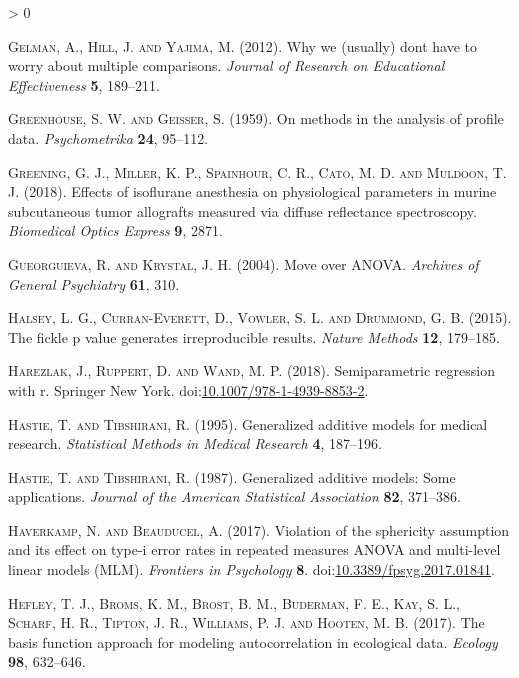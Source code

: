 \documentclass[
]{article}
\newlength{\cslhangindent}
\newenvironment{CSLReferences}[2] %
 {%
  \setlength{\parindent}{0pt}
  \ifodd #1 \everypar{\setlength{\hangindent}{\cslhangindent}}\ignorespaces\fi
  \ifnum #2 > 0
  \setlength{\parskip}{#2\baselineskip}
  \fi
 }%
 {}
\begin{document}
\begin{CSLReferences}{1}{0}
\leavevmode\hypertarget{ref-gelman2012}{}%
\textsc{Gelman, A., Hill, J. and Yajima, M.} (2012). Why we (usually) don{{}}t have to worry about multiple comparisons. \emph{Journal of Research on Educational Effectiveness} \textbf{5}, 189--211.

\leavevmode\hypertarget{ref-greenhouse1959}{}%
\textsc{Greenhouse, S. W. and Geisser, S.} (1959). On methods in the analysis of profile data. \emph{Psychometrika} \textbf{24}, 95--112.

\leavevmode\hypertarget{ref-greening2018}{}%
\textsc{Greening, G. J., Miller, K. P., Spainhour, C. R., Cato, M. D. and Muldoon, T. J.} (2018). Effects of isoflurane anesthesia on physiological parameters in murine subcutaneous tumor allografts measured via diffuse reflectance spectroscopy. \emph{Biomedical Optics Express} \textbf{9}, 2871.

\leavevmode\hypertarget{ref-gueorguieva2004}{}%
\textsc{Gueorguieva, R. and Krystal, J. H.} (2004). Move over {ANOVA}. \emph{Archives of General Psychiatry} \textbf{61}, 310.

\leavevmode\hypertarget{ref-halsey2015}{}%
\textsc{Halsey, L. G., Curran-Everett, D., Vowler, S. L. and Drummond, G. B.} (2015). The fickle p value generates irreproducible results. \emph{Nature Methods} \textbf{12}, 179--185.

\leavevmode\hypertarget{ref-harezlak2018}{}%
\textsc{Harezlak, J., Ruppert, D. and Wand, M. P.} (2018). Semiparametric regression with r. Springer New York. doi:\href{https://doi.org/10.1007/978-1-4939-8853-2}{10.1007/978-1-4939-8853-2}.

\leavevmode\hypertarget{ref-hastie1995}{}%
\textsc{Hastie, T. and Tibshirani, R.} (1995). Generalized additive models for medical research. \emph{Statistical Methods in Medical Research} \textbf{4}, 187--196.

\leavevmode\hypertarget{ref-hastie1987}{}%
\textsc{Hastie, T. and Tibshirani, R.} (1987). Generalized additive models: Some applications. \emph{Journal of the American Statistical Association} \textbf{82}, 371--386.

\leavevmode\hypertarget{ref-haverkamp2017}{}%
\textsc{Haverkamp, N. and Beauducel, A.} (2017). Violation of the sphericity assumption and its effect on type-i error rates in repeated measures {ANOVA} and multi-level linear models ({MLM}). \emph{Frontiers in Psychology} \textbf{8}. doi:\href{https://doi.org/10.3389/fpsyg.2017.01841}{10.3389/fpsyg.2017.01841}.

\leavevmode\hypertarget{ref-hefley2017}{}%
\textsc{Hefley, T. J., Broms, K. M., Brost, B. M., Buderman, F. E., Kay, S. L., Scharf, H. R., Tipton, J. R., Williams, P. J. and Hooten, M. B.} (2017). The basis function approach for modeling autocorrelation in ecological data. \emph{Ecology} \textbf{98}, 632--646.


\end{CSLReferences}
\end{document}
